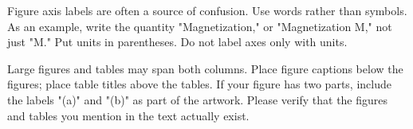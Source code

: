 \documentclass[journal]{IAENGtran}
\begin{document}
Figure axis labels are often a source of confusion. Use words rather
than symbols. As an example, write the quantity "Magnetization," or
"Magnetization M," not just "M." Put units in parentheses. Do not
label axes only with units.

Large figures and tables may span both columns. Place figure
captions below the figures; place table titles above the tables. If
your figure has two parts, include the labels "(a)" and "(b)" as
part of the artwork. Please verify that the figures and tables you
mention in the text actually exist.




%
%


%
\end{document}
